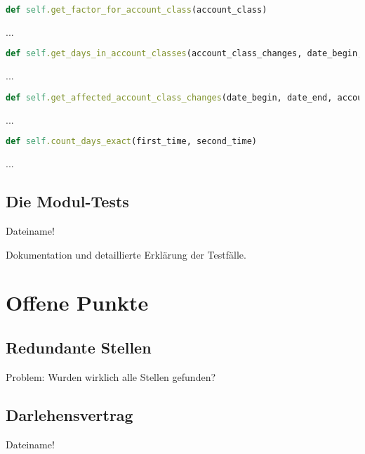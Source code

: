\documentclass[12pt]{scrreprt}
\begin{document}
\begin{lstlisting}[language=Ruby]
def self.get_factor_for_account_class(account_class) 
\end{lstlisting}
... \\

\begin{lstlisting}[language=Ruby]
def self.get_days_in_account_classes(account_class_changes, date_begin, date_end)
\end{lstlisting}
... \\

\begin{lstlisting}[language=Ruby]
def self.get_affected_account_class_changes(date_begin, date_end, account_number)
\end{lstlisting}
... \\

\begin{lstlisting}[language=Ruby]
def self.count_days_exact(first_time, second_time)
\end{lstlisting}
... \\

\subsection{Die Modul-Tests}

Dateiname!

Dokumentation und detaillierte Erklärung der Testfälle. 

\section{Offene Punkte}
\subsection{Redundante Stellen}
Problem: Wurden wirklich alle Stellen gefunden?
\subsection{Darlehensvertrag} Dateiname!
\end{document}

